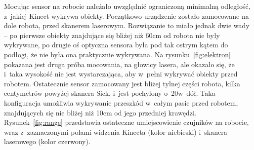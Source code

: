 Mocując sensor na robocie należało uwzględnić ograniczoną minimalną odległość,
z~jakiej Kinect wykrywa obiekty. Początkowo urządzenie zostało zamocowane na
dole robota, przed skanerem laserowym. Rozwiązanie to miało jednak dwie wady --
po pierwsze obiekty znajdujące się bliżej niż 60cm od robota nie były
wykrywane, po drugie oś optyczna sensora była pod tak ostrym kątem do podłogi,
że nie była ona praktycznie wykrywana. Na rysunku~\ref{fig:elektron} pokazana
jest druga próba mocowania, na głowicy lasera, ale okazało się, że i~taka
wysokość nie jest wystarczająca, aby w~pełni wykrywać obiekty przed robotem.
Ostatecznie sensor zamocowany jest bliżej tylnej części robota, kilka
centymetrów powyżej skanera Sick, i~jest pochylony o~20\textdegree w~dół. Taka
konfiguracja umożliwia wykrywanie przeszkód w~całym pasie przed robotem,
znajdujących się nie bliżej niż 10cm od jego przedniej krawędzi.
Rysunek~\ref{fig:range} przedstawia ostateczne umiejscowienie czujników
na robocie, wraz z~zaznaczonymi polami widzenia Kinecta (kolor niebieski) 
i~skanera laserowego (kolor czerwony).



